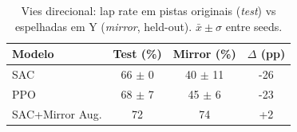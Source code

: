 \begin{table}[H]
\centering
\caption{Vies direcional: lap rate em pistas originais (\textit{test}) vs espelhadas em Y (\textit{mirror}, held-out). $\bar{x}\pm\sigma$ entre seeds.}
\label{tab:direction_bias}
\begin{tabular}{lccc}
\toprule
\textbf{Modelo} & \textbf{Test (\%)} & \textbf{Mirror (\%)} & \textbf{$\Delta$ (pp)} \\
\midrule
SAC & 66 $\pm$ 0 & 40 $\pm$ 11 & -26 \\
PPO & 68 $\pm$ 7 & 45 $\pm$ 6 & -23 \\
SAC+Mirror Aug. & 72 & 74 & +2 \\
\bottomrule
\end{tabular}
\end{table}
